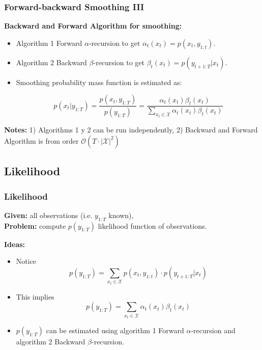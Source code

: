 \documentclass[xcolor=dvipsnames, compress]{beamer}
\begin{document}
\begin{frame}
\frametitle{Forward-backward Smoothing III}
\textbf{Backward and Forward Algorithm for smoothing:}

\begin{itemize}
	\item Algorithm 1 Forward $\alpha$-recursion to get $\alpha_t(x_t)=p(x_t , y_{1:t})$.
	\item Algorithm 2 Backward $\beta$-recursion to get $\beta_t(x_t)=p(y_{t+1:T} |x_t )$.
	\item Smoothing probability mass function is estimated as:
	
	$$ p(x_t | y_{1:T}) = \frac{p(x_t, y_{1:T})}{p(y_{1:T})}=\frac{\alpha_t(x_t) \beta_t(x_t)}{\sum_{x_t \in \mathcal{X}} \alpha_t(x_t) \beta_t(x_t)}$$

\end{itemize}
\vspace{0.5cm}
 \textbf{Notes:} 1) Algorithms 1 y 2 can be run independently, 2) Backward and Forward Algorithm is from order $\mathcal{O}(T\cdot|\mathcal{X}|^2)$

\end{frame}


\begin{frame}
\section{Likelihood}
\frametitle{Likelihood}

\textbf{Given:} all observations (i.e. $y_{1:T}$ known),\\
\textbf{Problem:} compute $p(y_{1:T})$ likelihood function of observations.

\vspace{0.5cm}

\textbf{Ideas:}

\begin{itemize}
	\item Notice $$p(y_{1:T} ) = \sum_{x_t \in \mathcal{X}} p(x_t , y_{1:t} ) \cdot p(y_{t+1:T} |x_t )$$
	\item This implies $$p(y_{1:T} ) = \sum_{x_t \in \mathcal{X}} \alpha_t(x_t) \beta_t(x_t) $$
	
	\item $p(y_{1:T} )$ can be estimated using algorithm 1 Forward $\alpha$-recursion and algorithm 2 Backward $\beta$-recursion.
	
\end{itemize}

\end{frame}
\end{document}
